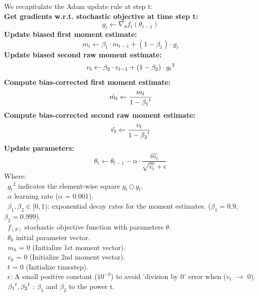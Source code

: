 \documentclass{ieeeojies}
\begin{document}
\noindent We recapitulate the Adam update rule at step t:\\
\textbf{Get gradients w.r.t. stochastic objective at time step t\cite{Adam_4}:} 
\[\ g_t \leftarrow \nabla_\theta f_t (\theta_{t-1})\]
\textbf{Update biased first moment estimate\cite{Adam_4}: } 
\[\ m_t \leftarrow \beta_1 \cdot m_{t-1} + (1 - \beta_1) \cdot g_t\]
\textbf{Update biased second raw moment estimate: } 
\[\ v_t \leftarrow \beta_2 \cdot v_{t-1} + (1 - \beta_2) \cdot {g_t}\sp{2}\]
\textbf{Compute bias-corrected first moment estimate\cite{Adam_4}: } 
\[\ \hat{m_t} \leftarrow \frac{m_t}{1 - {\beta_1}\sp{t}}\]
\textbf{Compute bias-corrected second raw moment estimate\cite{Adam_4}: } 
\[\ \hat{v_t} \leftarrow \frac{v_t}{1 - {\beta_2}\sp{t}}\]
\textbf{Update parameters\cite{Adam_4}: } 
\[\ \theta_t \leftarrow  \theta_{t-1} - \alpha \cdot \frac {\hat{m_t}} {\sqrt{\hat{v_t}} + \epsilon}\]
Where: \\
        \indent\textbullet\ ${g_t}^2$ indicates the element-wise square ${g_t} \odot {g_t}$.\\
        \indent\textbullet\ $\alpha$ learning rate ($\alpha$ = 0.001).\\
        \indent\textbullet\ $\beta_1, \beta_2 \in [0, 1)$: exponential decay rates for the moment estimates. ($\beta_1 = 0.9$, $\beta_2 = 0.999$).\\
        \indent\textbullet\ $f_(\theta)$ stochastic objective function with parameters $\theta$. \\
        \indent\textbullet\ $\theta_0$ initial parameter vector.\\
        \indent\textbullet\ $m_0$ = 0 (Initialize 1st moment vector).\\
        \indent\textbullet\ $v_0$ = 0 (Initialize 2nd moment vector).\\
        \indent\textbullet\ $t$ = 0 (Initialize timestep).\\
        \indent\textbullet\ $\epsilon$: A small positive constant ($10^{-8}$) to avoid 'division by 0' error when ($v_t$ $\rightarrow$ 0).\\
        \indent\textbullet\ \({\beta_1}\sp{t}, {\beta_2}\sp{t}\) : $\beta_1$ and $\beta_2$ to the power t.\\
\end{document}
